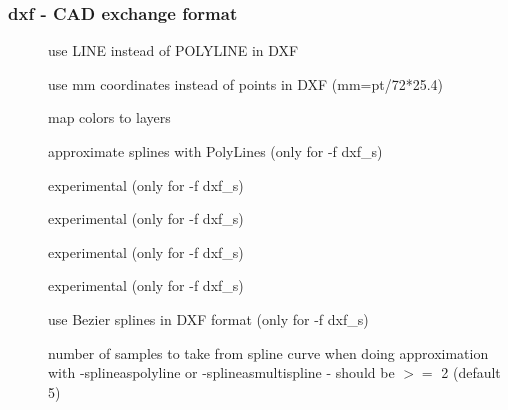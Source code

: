 \documentclass[english,a4paper]{article}
\begin{document}
\subsubsection{dxf - CAD exchange format}
\begin{description}
\item[] 
use LINE instead of POLYLINE in DXF


\item[] 
use mm coordinates instead of points in DXF (mm=pt/72*25.4)


\item[] 
map colors to layers


\item[] 
approximate splines with PolyLines (only for -f dxf\_s)


\item[] 
experimental (only for -f dxf\_s)


\item[] 
experimental (only for -f dxf\_s)


\item[] 
experimental (only for -f dxf\_s)


\item[] 
experimental (only for -f dxf\_s)


\item[] 
use Bezier splines in DXF format (only for -f dxf\_s)


\item[] 
number of samples to take from spline curve when doing approximation with -splineaspolyline or -splineasmultispline - should be $>=$ 2 (default 5)


\end{description}
\end{document}

